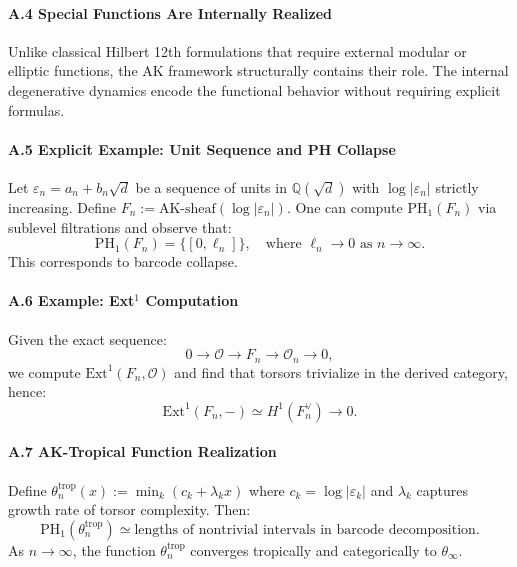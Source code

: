 \documentclass[11pt]{article}
\begin{document}
\paragraph{A.4 Special Functions Are Internally Realized}
Unlike classical Hilbert 12th formulations that require external modular or elliptic functions, the AK framework structurally contains their role. The internal degenerative dynamics encode the functional behavior without requiring explicit formulas.

\paragraph{A.5 Explicit Example: Unit Sequence and PH Collapse}
Let $\varepsilon_n = a_n + b_n \sqrt{d}$ be a sequence of units in $\mathbb{Q}(\sqrt{d})$ with $\log |\varepsilon_n|$ strictly increasing. Define $F_n := \text{AK-sheaf}(\log |\varepsilon_n|)$. One can compute PH$_1(F_n)$ via sublevel filtrations and observe that:
\[
\mathrm{PH}_1(F_n) = \{[0, \ell_n]\}, \quad \text{where } \ell_n \to 0 \text{ as } n \to \infty.
\]
This corresponds to barcode collapse.

\paragraph{A.6 Example: Ext$^1$ Computation}
Given the exact sequence:
\[
0 \to \mathcal{O} \to F_n \to \mathcal{O}_n \to 0,
\]
we compute $\mathrm{Ext}^1(F_n, \mathcal{O})$ and find that torsors trivialize in the derived category, hence:
\[
\mathrm{Ext}^1(F_n, -) \simeq H^1(F_n^\vee) \to 0.
\]

\paragraph{A.7 AK-Tropical Function Realization}
Define $\theta_n^{\text{trop}}(x) := \min_k (c_k + \lambda_k x)$ where $c_k = \log |\varepsilon_k|$ and $\lambda_k$ captures growth rate of torsor complexity. Then:
\[
\mathrm{PH}_1(\theta_n^{\text{trop}}) \simeq \text{lengths of nontrivial intervals in barcode decomposition}.
\]
As $n \to \infty$, the function $\theta_n^{\text{trop}}$ converges tropically and categorically to $\theta_\infty$.
\end{document}
